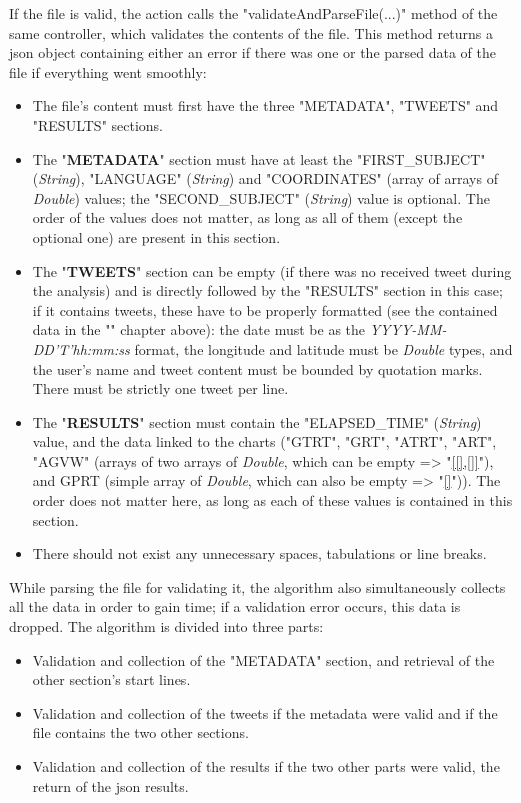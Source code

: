 \documentclass[a4paper,11pt]{report}
\begin{document}
If the file is valid, the action calls the "validateAndParseFile(...)" method of the same controller, which validates the contents of the file. This method returns a json object containing either an error if there was one or the parsed data of the file if everything went smoothly:
\begin{itemize}
	\item The file's content must first have the three "METADATA", "TWEETS" and "RESULTS" sections.
	\item The "\textbf{METADATA}" section must have at least the "FIRST\_SUBJECT" (\emph{String}), "LANGUAGE" (\emph{String}) and "COORDINATES" (array of arrays of \emph{Double}) values; the "SECOND\_SUBJECT" (\emph{String}) value is optional. The order of the values does not matter, as long as all of them (except the optional one) are present in this section.
	\item The "\textbf{TWEETS}" section can be empty (if there was no received tweet during the analysis) and is directly followed by the "RESULTS" section in this case; if it contains tweets, these have to be properly formatted (see the contained data in the "" chapter above): the date must be as the \emph{YYYY-MM-DD'T'hh:mm:ss} format, the longitude and latitude must be \emph{Double} types, and the user's name and tweet content must be bounded by quotation marks. There must be strictly one tweet per line.
	\item The "\textbf{RESULTS}" section must contain the "ELAPSED\_TIME" (\emph{String}) value, and the data linked to the charts ("GTRT", "GRT", "ATRT", "ART", "AGVW" (arrays of two arrays of \emph{Double}, which can be empty => "\underline{[[],[]]}"), and GPRT (simple array of \emph{Double}, which can also be empty => "\underline{[]}")). The order does not matter here, as long as each of these values is contained in this section.
	\item There should not exist any unnecessary spaces, tabulations or line breaks.
\end{itemize}

While parsing the file for validating it, the algorithm also simultaneously collects all the data in order to gain time; if a validation error occurs, this data is dropped. The algorithm is divided into three parts:
\begin{itemize}
	\item Validation and collection of the "METADATA" section, and retrieval of the other section's start lines.
	\item Validation and collection of the tweets if the metadata were valid and if the file contains the two other sections.
	\item Validation and collection of the results if the two other parts were valid, the return of the json results.
\end{itemize}
\end{document}
